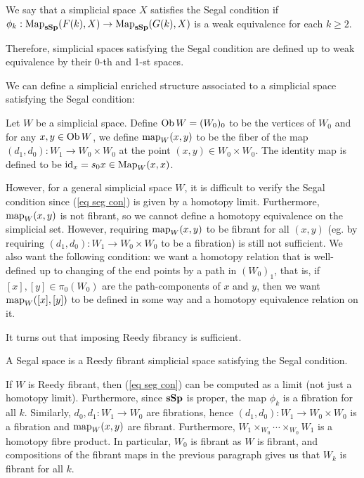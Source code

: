 \begin{refsection}
\begin{defin}
We say that a simplicial space $X$ satisfies the Segal condition if $\phi_k:\operatorname{\mathrm{Map}}_{\mathbf{sSp}}(F(k),X)\to\operatorname{\mathrm{Map}}_{\mathbf{sSp}}(G(k),X)$ is a weak equivalence for each $k\ge 2$.
\end{defin}

Therefore, simplicial spaces satisfying the Segal condition are defined up to weak equivalence by their 0-th and 1-st spaces.

We can define a simplicial enriched structure associated to a simplicial space satisfying the Segal condition:
\begin{defin}\label{simpcat}
Let $W$ be a simplicial space. Define $\operatorname{Ob} W=(W_0)_0$ to be the vertices of $W_0$ and for any $x,y\in\operatorname{Ob} W$, we define $\operatorname{\mathrm{map}}_W(x,y)$ to be the fiber of the map $(d_1,d_0):W_1\to W_0\times W_0$ at the point $(x,y)\in W_0\times W_0$. The identity map is defined to be $\mathrm{id}_x=s_0x\in\operatorname{\mathrm{Map}}_W(x,x)$.
\end{defin}
However, for a general simplicial space $W$, it is difficult to verify the Segal condition since (\ref{eq seg con}) is given by a homotopy limit. Furthermore, $\operatorname{\mathrm{map}}_W(x,y)$ is not fibrant, so we cannot define a homotopy equivalence on the simplicial set. However, requiring $\operatorname{\mathrm{map}}_W(x,y)$ to be fibrant for all $(x,y)$ (eg. by requiring $(d_1,d_0):W_1\to W_0\times W_0$ to be a fibration) is still not sufficient. We also want the following condition: we want a homotopy relation that is well-defined up to changing of the end points by a path in $(W_0)_1$, that is, if $[x],[y]\in\pi_0(W_0)$ are the path-components of $x$ and $y$, then we want $\operatorname{\mathrm{map}}_W([x],[y])$ to be defined in some way and a homotopy equivalence relation on it.

It turns out that imposing Reedy fibrancy is sufficient.
\begin{defin}
A Segal space is a Reedy fibrant simplicial space satisfying the Segal condition.
\end{defin}
If $W$ is Reedy fibrant, then (\ref{eq seg con}) can be computed as a limit (not just a homotopy limit). Furthermore, since $\mathbf{sSp}$ is proper, the map $\phi_k$ is a fibration for all $k$. Similarly, $d_0,d_1:W_1\to W_0$ are fibrations, hence $(d_1,d_0):W_1\to W_0\times W_0$ is a fibration and $\operatorname{\mathrm{map}}_W(x,y)$ are fibrant. Furthermore, $W_1\times_{W_0}\cdots\times_{W_0}W_1$ is a homotopy fibre product. In particular, $W_0$ is fibrant as $W$ is fibrant, and compositions of the fibrant maps in the previous paragraph gives us that $W_k$ is fibrant for all $k$.


\end{refsection}
